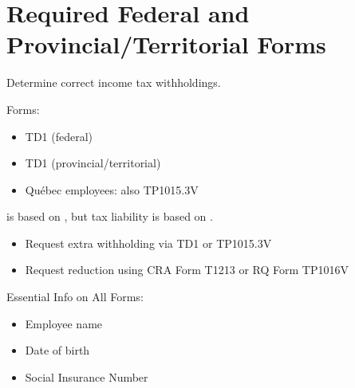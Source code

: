 \documentclass[letterpaper,10pt,english]{sphinxmanual}
\begin{document}
\section{Required Federal and Provincial/Territorial Forms}
\label{\detokenize{onboarding_employee:required-federal-and-provincial-territorial-forms}}
\sphinxAtStartPar
{} Determine correct income tax withholdings.

\sphinxAtStartPar
Forms:
\begin{itemize}
\item {} 
\sphinxAtStartPar
TD1 (federal)

\item {} 
\sphinxAtStartPar
TD1 (provincial/territorial)

\item {} 
\sphinxAtStartPar
Québec employees: also TP\sphinxhyphen{}1015.3\sphinxhyphen{}V

\end{itemize}

\sphinxAtStartPar
{} is based on , but tax liability is based on .

\sphinxAtStartPar
{}
\begin{itemize}
\item {} 
\sphinxAtStartPar
Request extra withholding via TD1 or TP\sphinxhyphen{}1015.3\sphinxhyphen{}V

\item {} 
\sphinxAtStartPar
Request reduction using CRA Form T1213 or RQ Form TP\sphinxhyphen{}1016\sphinxhyphen{}V

\end{itemize}

\sphinxAtStartPar
Essential Info on All Forms:
\begin{itemize}
\item {} 
\sphinxAtStartPar
Employee name

\item {} 
\sphinxAtStartPar
Date of birth

\item {} 
\sphinxAtStartPar
Social Insurance Number

\end{itemize}
\end{document}
